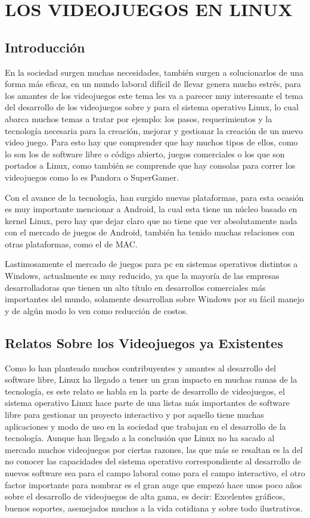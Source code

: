 \chapter*{LOS VIDEOJUEGOS EN LINUX}

\section*{Introducción}
En la sociedad surgen muchas necesidades, también surgen a solucionarlos de una forma más eficaz, en un mundo laboral difícil de llevar genera mucho estrés, para los 
amantes de los videojuegos este tema les va a parecer muy interesante el tema del desarrollo de los videojuegos sobre y para el sistema operativo Linux, lo cual abarca 
muchos temas a tratar por ejemplo: los pasos, requerimientos y la tecnología necesaria para la creación, mejorar y gestionar la creación de un nuevo video juego. Para 
esto hay que comprender que hay muchos tipos de ellos, como lo son los de software libre o código abierto, juegos comerciales o los que son portados a Linux, como también 
se comprende que hay consolas para correr los videojuegos como lo es Pandora o SuperGamer.

Con el avance de la tecnología, han surgido nuevas plataformas, para esta ocasión es muy importante mencionar a Android, la cual esta tiene un núcleo basado en kernel 
Linux, pero hay que dejar claro que no tiene que ver absolutamente nada con el mercado de juegos de Android, también ha tenido muchas relaciones con otras plataformas, como 
el de MAC.

Lastimosamente el mercado de juegos para pc en sistemas operativos distintos a Windows, actualmente es muy reducido, ya que la mayoría de las empresas desarrolladoras que 
tienen un alto título en desarrollos comerciales más importantes del mundo, solamente desarrollan sobre Windows por su fácil manejo y de algún modo lo ven como reducción de 
costos.

\section*{Relatos Sobre los Videojuegos ya Existentes}
Como lo han planteado muchos contribuyentes y amantes al desarrollo del software libre, Linux ha llegado a tener un gran impacto en muchas ramas de la tecnología, es este 
relato se habla en la parte de desarrollo de videojuegos, el sistema operativo Linux hace parte de una listas más importantes de software libre para gestionar un proyecto 
interactivo y por aquello tiene muchas aplicaciones y modo de uso en la sociedad que trabajan en el desarrollo de la tecnología. Aunque han llegado a la conclusión que 
Linux no ha sacado al mercado muchos videojuegos por ciertas razones, las que más se resaltan es la del no conocer las capacidades del sistema operativo correspondiente al 
desarrollo de nuevos software sea para el campo laboral como para el campo interactivo, el otro factor importante para nombrar es el gran auge que empezó hace unos poco 
años sobre el desarrollo de videojuegos de alta gama, es decir: Excelentes gráficos, buenos soportes, asemejados muchos a la vida cotidiana y sobre todo ilustrativos.

